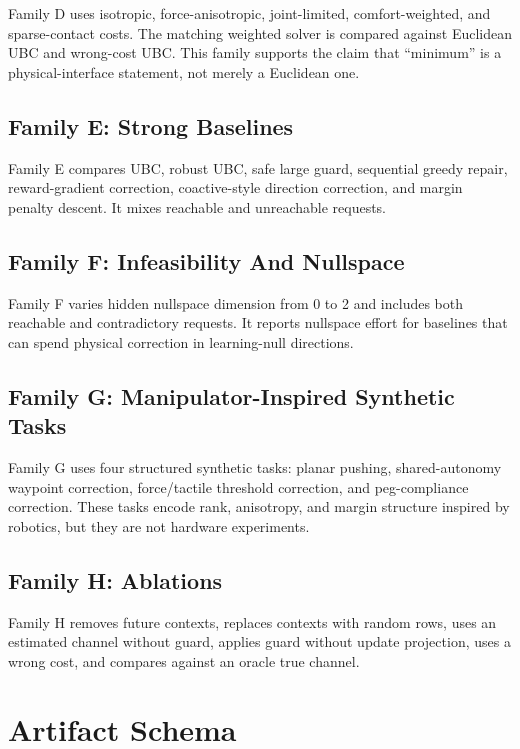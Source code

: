 \documentclass{article}
\begin{document}
Family D uses isotropic, force-anisotropic, joint-limited, comfort-weighted, and
sparse-contact costs. The matching weighted solver is compared against Euclidean
UBC and wrong-cost UBC. This family supports the claim that ``minimum'' is a
physical-interface statement, not merely a Euclidean one.

\subsection{Family E: Strong Baselines}

Family E compares UBC, robust UBC, safe large guard, sequential greedy repair,
reward-gradient correction, coactive-style direction correction, and margin
penalty descent. It mixes reachable and unreachable requests.

\subsection{Family F: Infeasibility And Nullspace}

Family F varies hidden nullspace dimension from 0 to 2 and includes both
reachable and contradictory requests. It reports nullspace effort for baselines
that can spend physical correction in learning-null directions.

\subsection{Family G: Manipulator-Inspired Synthetic Tasks}

Family G uses four structured synthetic tasks: planar pushing, shared-autonomy
waypoint correction, force/tactile threshold correction, and peg-compliance
correction. These tasks encode rank, anisotropy, and margin structure inspired
by robotics, but they are not hardware experiments.

\subsection{Family H: Ablations}

Family H removes future contexts, replaces contexts with random rows, uses an
estimated channel without guard, applies guard without update projection, uses a
wrong cost, and compares against an oracle true channel.

\section{Artifact Schema}
\end{document}
